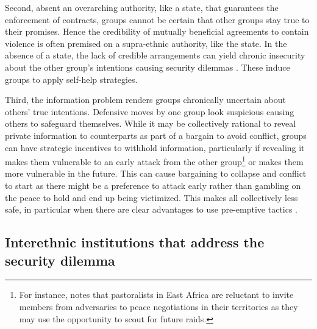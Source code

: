Second, absent an overarching authority, like a state, that guarantees the
enforcement of contracts, groups cannot be certain that other groups stay
true to their promises. Hence the credibility of mutually beneficial agreements to
contain violence is often premised on a supra-ethnic authority, like the state.
In the absence of a state, the lack of credible arrangements can yield chronic
insecurity about the other group’s intentions causing security dilemmas
\citep[51]{Lake_1996}. These induce groups to apply self-help strategies. 

Third, the information problem renders groups chronically uncertain about
others’ true intentions. Defensive moves by one group look suspicious causing
others to safeguard themselves. While it may be collectively rational to reveal
private information to counterparts as part of a bargain to avoid conflict,
groups can have strategic incentives to withhold information, particularly if
revealing it makes them vulnerable to an early attack from the other
group\footnote{For instance, \citet{Eaton_2008} notes that pastoralists in East
	Africa are reluctant to invite members from adversaries to peace
negotiations in their territories as they may use the opportunity to scout for
future raids.} or makes them more vulnerable in the future. This can cause
bargaining to collapse and conflict to start as there might be a preference to
attack early rather than gambling on the peace to hold and end up being
victimized. This makes all collectively less safe, in particular when there are
clear advantages to use pre-emptive tactics \citep[53]{Lake_1996}.

\subsection{Interethnic institutions that address the security dilemma} 
\label{Interethnic institutions that address the security dilemma}

